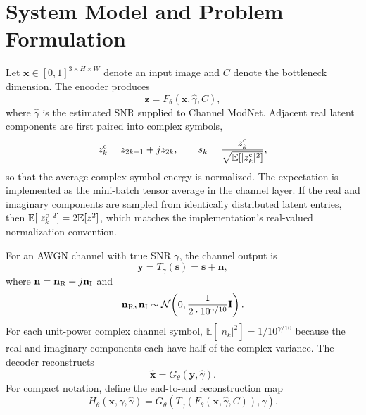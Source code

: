 \documentclass[10pt,journal]{IEEEtran}
\begin{document}
\section{System Model and Problem Formulation}

Let $\mathbf{x}\in[0,1]^{3\times H\times W}$ denote an input image and $C$ denote the bottleneck dimension. The encoder produces
\begin{equation}
\mathbf{z}=F_{\theta}(\mathbf{x},\hat{\gamma},C),
\label{eq:encoder}
\end{equation}
where $\hat{\gamma}$ is the estimated SNR supplied to Channel ModNet. Adjacent real latent components are first paired into complex symbols,
\begin{equation}
z_k^{\rm c}=z_{2k-1}+jz_{2k},\qquad
s_k=\frac{z_k^{\rm c}}{\sqrt{\mathbb{E}[|z_k^{\rm c}|^2]}} ,
\label{eq:power_norm}
\end{equation}
so that the average complex-symbol energy is normalized. The expectation is implemented as the mini-batch tensor average in the channel layer. If the real and imaginary components are sampled from identically distributed latent entries, then $\mathbb{E}[|z_k^{\rm c}|^2]=2\mathbb{E}[z^2]$, which matches the implementation's real-valued normalization convention.

For an AWGN channel with true SNR $\gamma$, the channel output is
\begin{equation}
\mathbf{y}=T_{\gamma}(\mathbf{s})=\mathbf{s}+\mathbf{n},
\label{eq:awgn}
\end{equation}
where $\mathbf{n}=\mathbf{n}_{\rm R}+j\mathbf{n}_{\rm I}$ and
\begin{equation}
\mathbf{n}_{\rm R},\mathbf{n}_{\rm I}\sim
\mathcal{N}\!\left(0,\frac{1}{2\cdot10^{\gamma/10}}\mathbf{I}\right).
\label{eq:noise}
\end{equation}
For each unit-power complex channel symbol, $\mathbb{E}[|n_k|^2]=1/10^{\gamma/10}$ because the real and imaginary components each have half of the complex variance. The decoder reconstructs
\begin{equation}
\hat{\mathbf{x}}=G_{\theta}(\mathbf{y},\hat{\gamma}).
\label{eq:decoder}
\end{equation}
For compact notation, define the end-to-end reconstruction map
\begin{equation}
H_{\theta}(\mathbf{x},\gamma,\hat{\gamma})
=G_{\theta}(T_{\gamma}(F_{\theta}(\mathbf{x},\hat{\gamma},C)),\hat{\gamma}).
\label{eq:end_to_end}
\end{equation}
\end{document}
